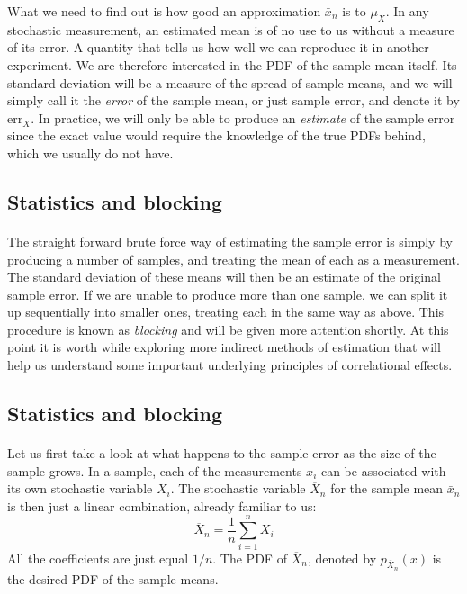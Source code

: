 \documentclass[%
twoside,                 %
final,                   %
10pt]{article}
\begin{document}
What we need to find out is how good an approximation $\bar{x}_n$ is to
$\mu_X^{\phantom X}$. In any stochastic measurement, an estimated
mean is of no use to us without a measure of its error. A quantity
that tells us how well we can reproduce it in another experiment. We
are therefore interested in the PDF of the sample mean itself. Its
standard deviation will be a measure of the spread of sample means,
and we will simply call it the \emph{error} of the sample mean, or
just sample error, and denote it by $\mathrm{err}_X^{\phantom X}$. In
practice, we will only be able to produce an \emph{estimate} of the
sample error since the exact value would require the knowledge of the
true PDFs behind, which we usually do not have.



\subsection*{Statistics and blocking}

\paragraph{}
The straight forward brute force way of estimating the sample error is
simply by producing a number of samples, and treating the mean of each
as a measurement. The standard deviation of these means will then be
an estimate of the original sample error. If we are unable to produce
more than one sample, we can split it up sequentially into smaller
ones, treating each in the same way as above. This procedure is known
as \emph{blocking} and will be given more attention shortly. At this
point it is worth while exploring more indirect methods of estimation
that will help us understand some important underlying principles of
correlational effects.




\subsection*{Statistics and blocking}

\paragraph{}
Let us first take a look at what happens to the sample error as the
size of the sample grows. In a sample, each of the measurements $x_i$
can be associated with its own stochastic variable $X_i$. The
stochastic variable $\overline X_n$ for the sample mean $\bar{x}_n$ is
then just a linear combination, already familiar to us:
\[
\overline X_n = \frac{1}{n}\sum_{i=1}^n X_i
\]
All the coefficients are just equal $1/n$. The PDF of $\overline X_n$,
denoted by $p_{\overline X_n}(x)$ is the desired PDF of the sample
means.
\end{document}
